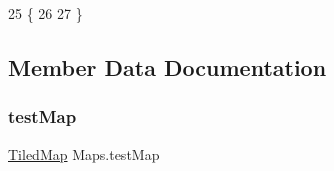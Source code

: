 \begin{DoxyCode}
25         \{
26             
27         \}
\end{DoxyCode}


\subsection{Member Data Documentation}
\mbox{\label{class_maps_aeee11ea1ad8b6b1384fc9fa1430c051e}} 
\subsubsection{\texorpdfstring{test\+Map}{testMap}}
{\footnotesize\ttfamily \mbox{\hyperlink{classorg_1_1newdawn_1_1slick_1_1tiled_1_1_tiled_map}{Tiled\+Map}} Maps.\+test\+Map\hspace{0.3cm}{\ttfamily [private]}}

